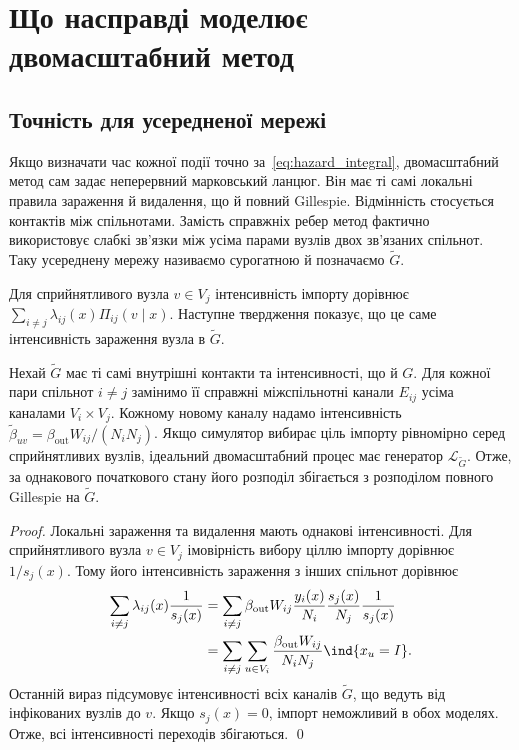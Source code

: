 
\section{Що насправді моделює двомасштабний метод}
\label{sec:analysis}

\subsection{Точність для усередненої мережі}
\label{sec:surrogate}

Якщо визначати час кожної події точно за~\eqref{eq:hazard_integral}, двомасштабний метод сам задає неперервний марковський ланцюг. Він має ті самі локальні правила зараження й видалення, що й повний Gillespie. Відмінність стосується контактів між спільнотами. Замість справжніх ребер метод фактично використовує слабкі зв'язки між усіма парами вузлів двох зв'язаних спільнот. Таку усереднену мережу називаємо сурогатною й позначаємо $\tilde G$.
\par Для сприйнятливого вузла $v\in V_j$ інтенсивність імпорту дорівнює $\sum_{i\neq j}\lambda_{ij}(x)\Pi_{ij}(v\mid x)$. Наступне твердження показує, що це саме інтенсивність зараження вузла в $\tilde G$.

\begin{proposition}
\label{prop:surrogate}
Нехай $\tilde G$ має ті самі внутрішні контакти та інтенсивності, що й $G$. Для кожної пари спільнот $i\neq j$ замінимо її справжні міжспільнотні канали $E_{ij}$ усіма каналами $V_i\times V_j$. Кожному новому каналу надамо інтенсивність $\tilde\beta_{uv}=\beta_{\mathrm{out}}W_{ij}/(N_iN_j)$. Якщо симулятор вибирає ціль імпорту рівномірно серед сприйнятливих вузлів, ідеальний двомасштабний процес має генератор $\mathcal{L}_{\tilde G}$. Отже, за однакового початкового стану його розподіл збігається з розподілом повного Gillespie на $\tilde G$.
\end{proposition}

\begin{proof}
Локальні зараження та видалення мають однакові інтенсивності. Для сприйнятливого вузла $v\in V_j$ імовірність вибору ціллю імпорту дорівнює $1/s_j(x)$. Тому його інтенсивність зараження з інших спільнот дорівнює
\[
\begin{aligned}
\sum_{i\neq j}\lambda_{ij}(x)\frac{1}{s_j(x)}
&=\sum_{i\neq j}\beta_{\mathrm{out}}W_{ij}\frac{y_i(x)}{N_i}\frac{s_j(x)}{N_j}\frac{1}{s_j(x)}\\
&=\sum_{i\neq j}\sum_{u\in V_i}\frac{\beta_{\mathrm{out}}W_{ij}}{N_iN_j}\ind\{x_u=I\}.
\end{aligned}
\]
Останній вираз підсумовує інтенсивності всіх каналів $\tilde G$, що ведуть від інфікованих вузлів до $v$. Якщо $s_j(x)=0$, імпорт неможливий в обох моделях. Отже, всі інтенсивності переходів збігаються. \qed
\end{proof}

